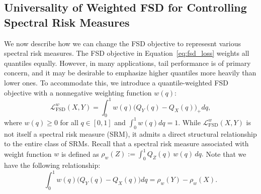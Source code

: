 

\subsection{Universality of Weighted FSD for Controlling Spectral Risk Measures}\label{subsec:srm}


We now describe how we can change the FSD objective to represesnt various spectral risk measures. The FSD objective in Equation~\ref{eq:fsd_loss} weights all quantiles equally.
However, in many applications, tail performance is of primary concern, and it may be desirable to emphasize higher quantiles more heavily than lower ones.
To accommodate this, we introduce a quantile-weighted FSD objective with a nonnegative weighting function $w(q)$:
\begin{equation}
  \mathcal{L}_{\mathrm{FSD}}^{w}(X,Y)
  =
  \int_{0}^{1} w(q) \big(Q_{Y}(q) - Q_{X}(q)\big)_{+} dq,
  \label{eq:weighted-fsd-loss-dfn}
\end{equation}
where $w(q) \ge 0$ for all $q \in [0,1]$ and $\int_0^1 w(q) dq = 1$. While $\mathcal{L}_{\mathrm{FSD}}^{w}(X,Y)$ is not itself a spectral risk measure (SRM), it admits a direct structural relationship to the entire class of SRMs.
Recall that a spectral risk measure associated with weight function $w$ is defined as
\(
  \rho_w(Z) := \int_0^1 Q_Z(q)\, w(q)\, dq.
\)
Note that we have the following relationship:
\begin{equation}
  \int_{0}^{1} w(q) \big(Q_{Y}(q) - Q_{X}(q)\big) dq
  =
  \rho_w(Y) - \rho_w(X).
\end{equation}

